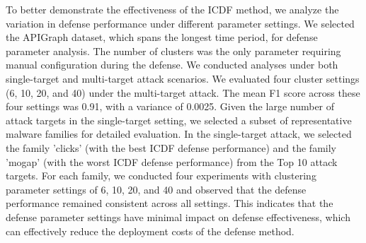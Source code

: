 \documentclass[conference,compsoc]{IEEEtran} %
\begin{document}
To better demonstrate the effectiveness of the ICDF method, we analyze the variation in defense performance under different parameter settings.
We selected the APIGraph dataset, which spans the longest time period, for defense parameter analysis.
The number of clusters was the only parameter requiring manual configuration during the defense.
We conducted analyses under both single-target and multi-target attack scenarios.  
We evaluated four cluster settings (6, 10, 20, and 40) under the multi-target attack. 
The mean F1 score across these four settings was 0.91, with a variance of 0.0025.
Given the large number of attack targets in the single-target setting, we selected a subset of representative malware families for detailed evaluation.
In the single-target attack, we selected the family 'clicks' (with the best ICDF defense performance) and the family 'mogap' (with the worst ICDF defense performance) from the Top 10 attack targets.
For each family, we conducted four experiments with clustering parameter settings of 6, 10, 20, and 40 and observed that the defense performance remained consistent across all settings.
This indicates that the defense parameter settings have minimal impact on defense effectiveness, which can effectively reduce the deployment costs of the defense method.
\end{document}
